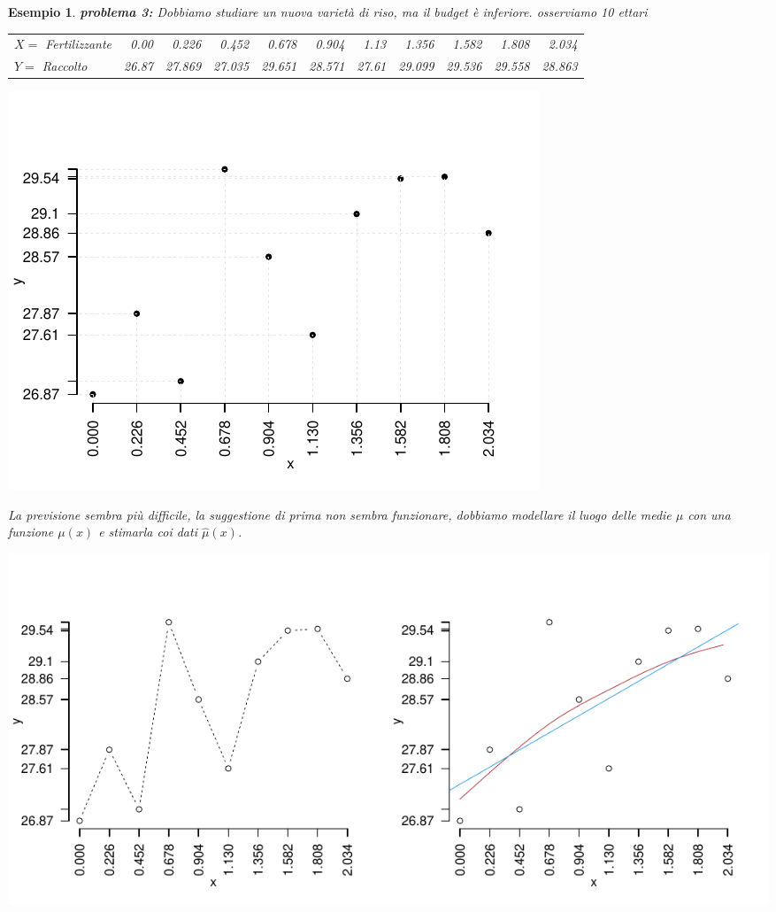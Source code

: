 \documentclass[
  11pt,
]{book}
\theoremstyle{mytheoremstyle}
\theoremstyle{mydefstyle}
\newtheorem{example}{{Esempio}}[section]
\begin{document}
\begin{example}

\textbf{problema 3:} Dobbiamo studiare un nuova varietà di riso, ma il budget è inferiore.
osserviamo 10 ettari

\begin{tabular}{lrrrrrrrrrr}
\toprule
$X=$ Fertilizzante & 0.00 & 0.226 & 0.452 & 0.678 & 0.904 & 1.13 & 1.356 & 1.582 & 1.808 & 2.034\\
$Y=$ Raccolto & 26.87 & 27.869 & 27.035 & 29.651 & 28.571 & 27.61 & 29.099 & 29.536 & 29.558 & 28.863\\
\bottomrule
\end{tabular}

\begin{center}\includegraphics{Appunti_di_Statistica_2025_files/figure-latex/17-regressione-I-15-1} \end{center}

La previsione sembra più difficile,
la suggestione di prima non sembra funzionare, dobbiamo modellare il luogo delle medie \(\mu\) con
una funzione \(\mu(x)\) e stimarla coi dati \(\hat\mu(x)\).

\begin{center}\includegraphics{Appunti_di_Statistica_2025_files/figure-latex/17-regressione-I-2-1} \end{center}

\end{example}
\end{document}

